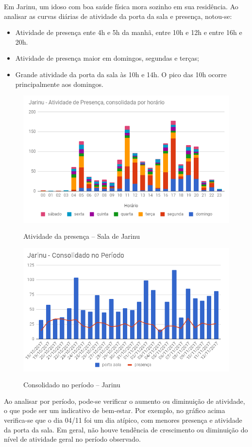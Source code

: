 Em Jarinu, um idoso com boa saúde física mora sozinho em sua residência. Ao analisar as curvas diárias de atividade da porta da sala e presença, notou-se:

\begin{itemize}
	\item Atividade de presença ente 4h e 5h da manhã, entre 10h e 12h e entre 16h e 20h.
	\item Atividade de presença maior em domingos, segundas e terças;
	\item Grande atividade da porta da sala às 10h e 14h. O pico das 10h ocorre principalmente aos domingos.
\end{itemize}

\begin{figure}[H]
	\centering
	\caption{Atividade da presença -- Sala de Jarinu}
	\includegraphics[width=1.0\textwidth]{AtivPresencaJarinu}
	\label{fig:AtivPresencaJarinu}
\end{figure}

\begin{figure}[H]
	\centering
	\caption{Consolidado no período -- Jarinu}
	\includegraphics[width=1.0\textwidth]{JarinuPeriodo}
	\label{fig:JarinuPeriodo}
\end{figure}

Ao analisar por período, pode-se verificar o aumento ou diminuição de atividade, o que pode ser um indicativo de bem-estar. Por exemplo, no gráfico acima verifica-se que o dia 04/11 foi um dia atípico, com menores presença e atividade da porta da sala. Em geral, não houve tendência de crescimento ou diminuição do nível de atividade geral no período observado.
